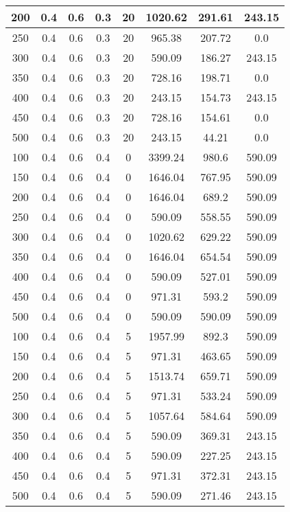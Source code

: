 \documentclass[a4paper, 12pt]{extreport}
\begin{document}
\begin{itemize}
\begin{longtable}{|c|c|c|c|c|c|c|c|}
			200 & 0.4 & 0.6 & 0.3 & 20 & 1020.62 & 291.61 & 243.15 \\\hline
			250 & 0.4 & 0.6 & 0.3 & 20 & 965.38 & 207.72 & 0.0 \\\hline
			300 & 0.4 & 0.6 & 0.3 & 20 & 590.09 & 186.27 & 243.15 \\\hline
			350 & 0.4 & 0.6 & 0.3 & 20 & 728.16 & 198.71 & 0.0 \\\hline
			400 & 0.4 & 0.6 & 0.3 & 20 & 243.15 & 154.73 & 243.15 \\\hline
			450 & 0.4 & 0.6 & 0.3 & 20 & 728.16 & 154.61 & 0.0 \\\hline
			500 & 0.4 & 0.6 & 0.3 & 20 & 243.15 & 44.21 & 0.0 \\\hline
			100 & 0.4 & 0.6 & 0.4 & 0 & 3399.24 & 980.6 & 590.09 \\\hline
			150 & 0.4 & 0.6 & 0.4 & 0 & 1646.04 & 767.95 & 590.09 \\\hline
			200 & 0.4 & 0.6 & 0.4 & 0 & 1646.04 & 689.2 & 590.09 \\\hline
			250 & 0.4 & 0.6 & 0.4 & 0 & 590.09 & 558.55 & 590.09 \\\hline
			300 & 0.4 & 0.6 & 0.4 & 0 & 1020.62 & 629.22 & 590.09 \\\hline
			350 & 0.4 & 0.6 & 0.4 & 0 & 1646.04 & 654.54 & 590.09 \\\hline
			400 & 0.4 & 0.6 & 0.4 & 0 & 590.09 & 527.01 & 590.09 \\\hline
			450 & 0.4 & 0.6 & 0.4 & 0 & 971.31 & 593.2 & 590.09 \\\hline
			500 & 0.4 & 0.6 & 0.4 & 0 & 590.09 & 590.09 & 590.09 \\\hline
			100 & 0.4 & 0.6 & 0.4 & 5 & 1957.99 & 892.3 & 590.09 \\\hline
			150 & 0.4 & 0.6 & 0.4 & 5 & 971.31 & 463.65 & 590.09 \\\hline
			200 & 0.4 & 0.6 & 0.4 & 5 & 1513.74 & 659.71 & 590.09 \\\hline
			250 & 0.4 & 0.6 & 0.4 & 5 & 971.31 & 533.24 & 590.09 \\\hline
			300 & 0.4 & 0.6 & 0.4 & 5 & 1057.64 & 584.64 & 590.09 \\\hline
			350 & 0.4 & 0.6 & 0.4 & 5 & 590.09 & 369.31 & 243.15 \\\hline
			400 & 0.4 & 0.6 & 0.4 & 5 & 590.09 & 227.25 & 243.15 \\\hline
			450 & 0.4 & 0.6 & 0.4 & 5 & 971.31 & 372.31 & 243.15 \\\hline
			500 & 0.4 & 0.6 & 0.4 & 5 & 590.09 & 271.46 & 243.15 \\\hline

\end{longtable}
\end{itemize}
\end{document}

